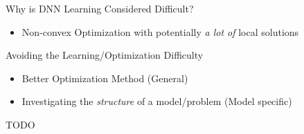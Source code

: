 \documentclass[first=dgreen,second=purple,logo=yellowexc]{aaltoslides}
\begin{document}
\begin{frame}{Why is DNN Learning Considered Difficult?}

    \begin{itemize}
        \item Non-convex Optimization with potentially
            \emph{a lot of} local solutions
    \end{itemize}

\end{frame}

\begin{frame}{Avoiding the Learning/Optimization Difficulty}
    \begin{itemize}
        \item Better Optimization Method (General)
        \item Investigating the \emph{structure} of a
            model/problem (Model specific)
    \end{itemize}
\end{frame}


\begin{frame}{}
    \alert{TODO}
\end{frame}
\end{document}
